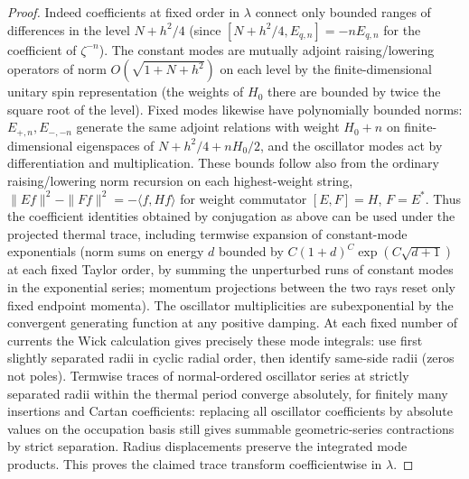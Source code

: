 \begin{proof}
Indeed coefficients at fixed order in \(\lambda\) connect only bounded ranges of differences in the level \(N+h^2/4\) (since \([N+h^2/4,E_{q,n}]=-n E_{q,n}\) for the coefficient of \(\zeta^{-n}\)). The constant modes are mutually adjoint raising/lowering operators of norm \(O(\sqrt{1+N+h^2})\) on each level by the finite-dimensional unitary spin representation (the weights of \(H_0\) there are bounded by twice the square root of the level). Fixed modes likewise have polynomially bounded norms: \(E_{+,n}, E_{-,-n}\) generate the same adjoint relations with weight \(H_0+n\) on finite-dimensional eigenspaces of \(N+h^2/4+nH_0/2\), and the oscillator modes act by differentiation and multiplication. These bounds follow also from the ordinary raising/lowering norm recursion on each highest-weight string, \(\|E f\|^2-\|F f\|^2=-\langle f,H f\rangle\) for weight commutator \([E,F]=H\), \(F=E^*\). Thus the coefficient identities obtained by conjugation as above can be used under the projected thermal trace, including termwise expansion of constant-mode exponentials (norm sums on energy \(d\) bounded by \(C(1+d)^C\exp(C\sqrt{d+1})\) at each fixed Taylor order, by summing the unperturbed runs of constant modes in the exponential series; momentum projections between the two rays reset only fixed endpoint momenta). The oscillator multiplicities are subexponential by the convergent generating function at any positive damping. At each fixed number of currents the Wick calculation gives precisely these mode integrals: use first slightly separated radii in cyclic radial order, then identify same-side radii (zeros not poles). Termwise traces of normal-ordered oscillator series at strictly separated radii within the thermal period converge absolutely, for finitely many insertions and Cartan coefficients: replacing all oscillator coefficients by absolute values on the occupation basis still gives summable geometric-series contractions by strict separation. Radius displacements preserve the integrated mode products. This proves the claimed trace transform coefficientwise in \(\lambda\).


\end{proof}
